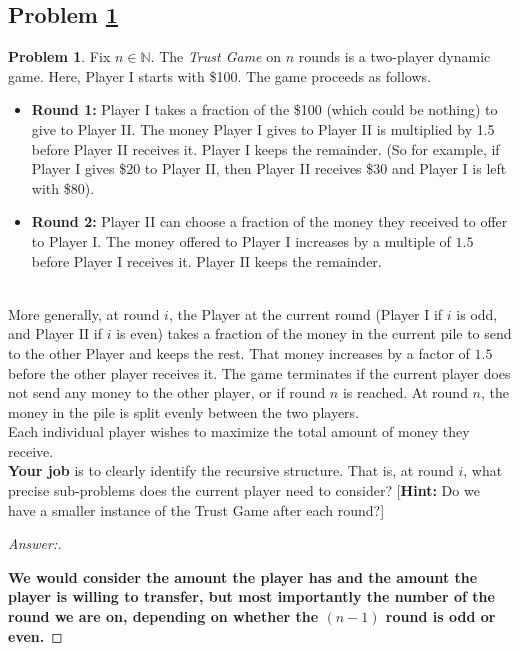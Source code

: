 \documentclass[11pt]{article}
\theoremstyle{definition}
\theoremstyle{definition}
\newtheorem{required}{Problem}
\theoremstyle{definition}
\begin{document}
\subsection{Problem \ref{DP2}}
\begin{required} \label{DP2}
Fix $n \in \mathbb{N}$. The \textit{Trust Game} on $n$ rounds is a two-player dynamic game. Here, Player I starts with \$100. The game proceeds as follows.
\begin{itemize}
\item \textbf{Round 1:} Player I takes a fraction of the \$100 (which could be nothing) to give to Player II. The money Player I gives to Player II is multiplied by 1.5 before Player II receives it. Player I keeps the remainder. (So for example, if Player I gives \$20 to Player II, then Player II receives \$30 and Player I is left with \$80).

\item \textbf{Round 2:} Player II can choose a fraction of the money they received to offer to Player I. The money offered to Player I increases by a multiple of $1.5$  before Player I receives it. Player II keeps the remainder.
\end{itemize}

\noindent \\ More generally, at round $i$, the Player at the current round (Player I if $i$ is odd, and Player II if $i$ is even) takes a fraction of the money in the current pile to send to the other Player and keeps the rest. That money increases by a factor of $1.5$ before the other player receives it. The game terminates if the current player does not send any money to the other player, or if round $n$ is reached. At round $n$, the money in the pile is split evenly between the two players. \\

\noindent Each individual player wishes to maximize the total amount of money they receive. \\

\noindent \textbf{Your job} is to clearly identify the recursive structure. That is, at round $i$, what precise sub-problems does the current player need to consider? [\textbf{Hint:} Do we have a smaller instance of the Trust Game after each round?]
\end{required}

\begin{proof}[Answer:] \
\item \textbf{We would consider the amount the player has and the amount the player is willing to transfer, but most importantly the number of the round we are on, depending on whether the $(n-1)$ round is odd or even.}

\end{proof}
\end{document}

